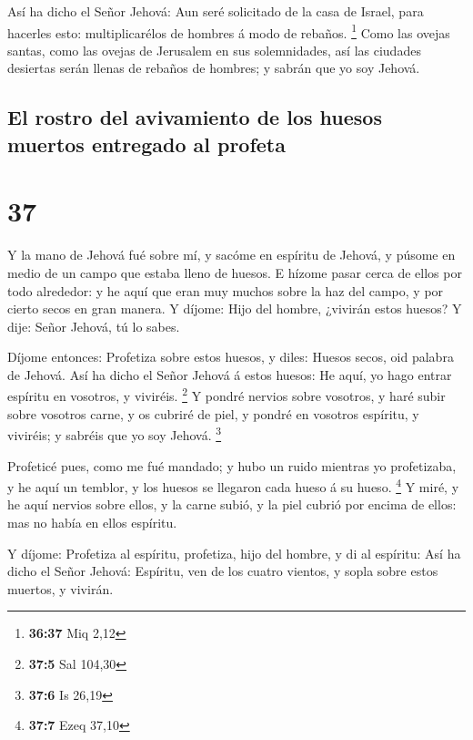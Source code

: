  Así ha dicho el Señor Jehová: Aun seré solicitado de la
casa de Israel, para hacerles esto: multiplicarélos de hombres á modo de
rebaños. \footnote{\textbf{36:37} Miq 2,12}  Como las
ovejas santas, como las ovejas de Jerusalem en sus solemnidades, así las
ciudades desiertas serán llenas de rebaños de hombres; y sabrán que yo
soy Jehová.

\hypertarget{el-rostro-del-avivamiento-de-los-huesos-muertos-entregado-al-profeta}{%
\subsection{El rostro del avivamiento de los huesos muertos entregado al
profeta}\label{el-rostro-del-avivamiento-de-los-huesos-muertos-entregado-al-profeta}}

\hypertarget{section-36}{%
\section{37}\label{section-36}}

 Y la mano de Jehová fué sobre mí, y sacóme en espíritu de
Jehová, y púsome en medio de un campo que estaba lleno de huesos.
 E hízome pasar cerca de ellos por todo alrededor: y he
aquí que eran muy muchos sobre la haz del campo, y por cierto secos en
gran manera.  Y díjome: Hijo del hombre, ¿vivirán estos
huesos? Y dije: Señor Jehová, tú lo sabes.

 Díjome entonces: Profetiza sobre estos huesos, y diles:
Huesos secos, oid palabra de Jehová.  Así ha dicho el
Señor Jehová á estos huesos: He aquí, yo hago entrar espíritu en
vosotros, y viviréis. \footnote{\textbf{37:5} Sal 104,30} 
Y pondré nervios sobre vosotros, y haré subir sobre vosotros carne, y os
cubriré de piel, y pondré en vosotros espíritu, y viviréis; y sabréis
que yo soy Jehová. \footnote{\textbf{37:6} Is 26,19}

 Profeticé pues, como me fué mandado; y hubo un ruido
mientras yo profetizaba, y he aquí un temblor, y los huesos se llegaron
cada hueso á su hueso. \footnote{\textbf{37:7} Ezeq 37,10}
 Y miré, y he aquí nervios sobre ellos, y la carne subió,
y la piel cubrió por encima de ellos: mas no había en ellos espíritu.

 Y díjome: Profetiza al espíritu, profetiza, hijo del
hombre, y di al espíritu: Así ha dicho el Señor Jehová: Espíritu, ven de
los cuatro vientos, y sopla sobre estos muertos, y vivirán.

